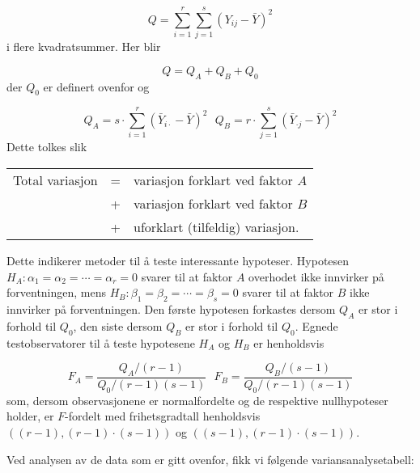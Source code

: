 \[  Q=\sum_{i=1}^{r}\sum_{j=1}^s {(Y_{ij}-\bar{Y})}^2 \]
i flere kvadratsummer.  Her blir 

\[    Q = Q_A + Q_B + Q_0    \]
der $Q_0$ er definert ovenfor og 

\[  Q_A=s\cdot \sum_{i=1}^{r}{(\bar{Y}_{i\cdot}-\bar{Y})}^2 \mbox{\ \ \ \ \  }
         Q_B=r\cdot \sum_{j=1}^{s}{(\bar{Y}_{\cdot j}-\bar{Y})}^2   \]
Dette tolkes slik
\begin{center}
\begin{tabular}{rcl}
Total variasjon & = & variasjon forklart ved faktor $A$  \\
                & + & variasjon forklart ved faktor $B$  \\
                & + & uforklart (tilfeldig) variasjon.   
\end{tabular}
\end{center}
Dette indikerer metoder til å teste interessante hypoteser.  
Hypotesen $H_A: {\alpha}_1 = {\alpha}_2 = \cdots = {\alpha}_r = 0$ 
svarer til at faktor $A$ overhodet ikke innvirker på forventningen,
mens $H_B: {\beta}_1 = {\beta}_2 = \cdots = {\beta}_s = 0$ svarer til
at faktor $B$ ikke innvirker på forventningen.  Den første 
hypotesen forkastes dersom $Q_A$ er stor i forhold til $Q_0$, den siste 
dersom $Q_B$ er stor i forhold til $Q_0$. Egnede testobservatorer til å
teste hypotesene $H_A$ og $H_B$ er henholdsvis 

\[ F_A=\frac{Q_A/(r-1)}{Q_0/(r-1)(s-1)} \mbox{\ \ \ }
                         F_B=\frac{Q_B/(s-1)}{Q_0/(r-1)(s-1)} \]
som, dersom observasjonene er normalfordelte og de respektive 
nullhypoteser holder, er $F$-fordelt med frihetsgradtall henholdsvis\\
$((r-1),(r-1)\cdot (s-1))$ og $((s-1),(r-1)\cdot (s-1))$.

Ved analysen av de data som er gitt ovenfor, fikk vi følgende 
variansanalysetabell: 
\begin{center}  \end{center}

